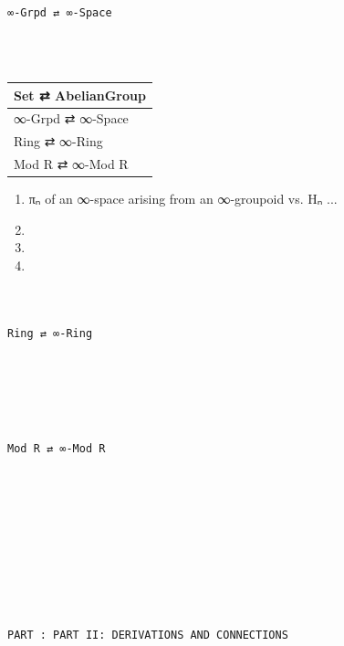 \documentclass{book}
\theoremstyle{definition}
\newcounter{pcounter}
\renewcommand{\chapter}[1]{
\newpage
{
\Huge 
\begin{center}
\ \\
\ \\
\thispagestyle{empty}
\texttt{#1}
\end{center}}
\ \\
\ \\
}
\newcounter{partcount}
\renewcommand{\part}[1]{
\newpage
{
\Huge 
\begin{center}
\ \\
\ \\
\ \\
\ \\
\ \\
\ \\
\thispagestyle{empty}
\texttt{PART {\thepartcount}: #1}
\stepcounter{partcount}
\end{center}}
\ \\
\ \\
}
\begin{document}

\chapter{∞-Grpd ⇄ ∞-Space}

{
\footnotesize
\begin{center}
\begin{tabular}{||l ||} 
 \hline
 \hline
Set ⇄ AbelianGroup \\
 \hline
∞-Grpd ⇄ ∞-Space \\
 \hline 
 \hline
Ring ⇄ ∞-Ring \\
 \hline
Mod R ⇄ ∞-Mod R \\
 \hline
 \hline
\end{tabular}
\end{center}
}

\begin{enumerate}
\item πₙ of an ∞-space arising from an ∞-groupoid vs. Hₙ ...
\item 
\item 
\item 
\end{enumerate}


\chapter{Ring ⇄ ∞-Ring}

\chapter{Mod R ⇄ ∞-Mod R}

\part{PART II: DERIVATIONS AND CONNECTIONS}
\end{document}
